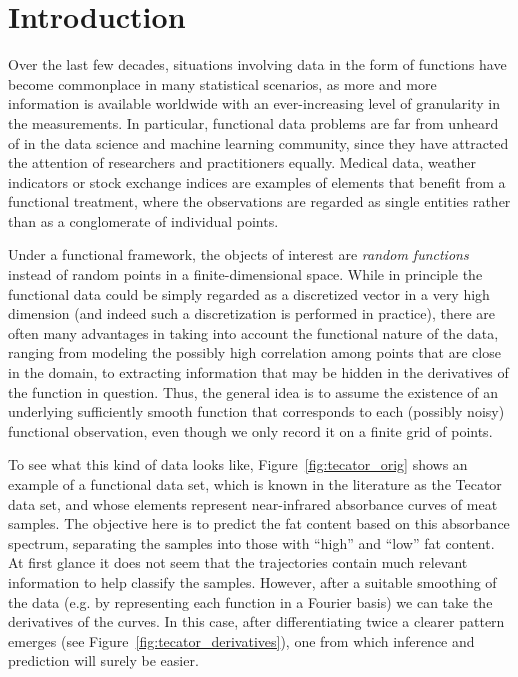 %
%

\chapter{Introduction}\label{ch:introduction}

Over the last few decades, situations involving data in the form of functions have become commonplace in many statistical scenarios, as more and more information is available worldwide with an ever-increasing level of granularity in the measurements. In particular, functional data problems are far from unheard of in the data science and machine learning community, since they have attracted the attention of researchers and practitioners equally. Medical data, weather indicators or stock exchange indices are examples of elements that benefit from a functional treatment, where the observations are regarded as single entities rather than as a conglomerate of individual points.

Under a functional framework, the objects of interest are \textit{random functions} instead of random points in a finite-dimensional space. While in principle the functional data could be simply regarded as a discretized vector in a very high dimension (and indeed such a discretization is performed in practice), there are often many advantages in taking into account the functional nature of the data, ranging from modeling the possibly high correlation among points that are close in the domain, to extracting information that may be hidden in the derivatives of the function in question. Thus, the general idea is to assume the existence of an underlying sufficiently smooth function that corresponds to each (possibly noisy) functional observation, even though we only record it on a finite grid of points.

To see what this kind of data looks like, Figure~\ref{fig:tecator_orig} shows an example of a functional data set, which is known in the literature as the Tecator data set, and whose elements represent near-infrared absorbance curves of meat samples. The objective here is to predict the fat content based on this absorbance spectrum, separating the samples into those with ``high'' and ``low'' fat content. At first glance it does not seem that the trajectories contain much relevant information to help classify the samples. However, after a suitable smoothing of the data (e.g. by representing each function in a Fourier basis) we can take the derivatives of the curves. In this case, after differentiating twice a clearer pattern emerges (see Figure~\ref{fig:tecator_derivatives}), one from which inference and prediction will surely be easier.

